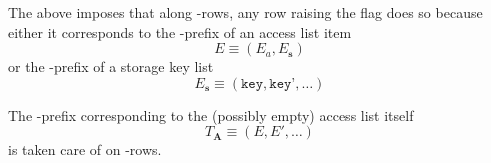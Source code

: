 \saNote{}
The above imposes that along \locAccessListData{}-rows, any row raising the
\rlpTxnSharedColumnIsPrefix{} flag does so because either it corresponds to
the \rlp{}-prefix of an access list item
\[
    E \equiv (E_a, E_\textbf{s})
\]
or the \rlp{}-prefix of a storage key list
\[
    E_\textbf{s} \equiv (\texttt{key}, \texttt{key'}, \dots)
\]

\saNote{}
The \rlp{}-prefix corresponding to the (possibly empty) access list itself
\[
    T_\mathbf{A} \equiv (E, E', \dots)
\]
is taken care of on \locAccessListPrefix{}-rows.
